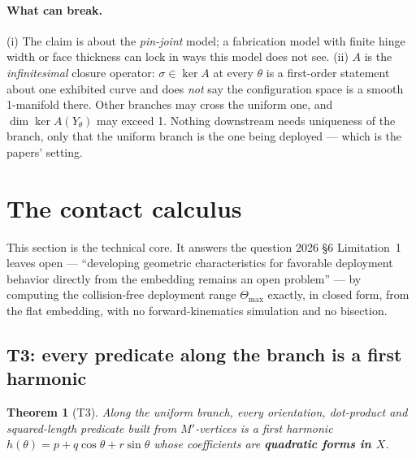 \documentclass[11pt,a4paper]{article}
\newtheorem{theorem}{Theorem}[section]
\theoremstyle{definition}
\newcommand{\Tmax}{\Theta_{\max}}
\newcommand{\Mprime}{M'}
\begin{document}
\paragraph{What can break.} (i) The claim is about the \emph{pin-joint} model; a fabrication
model with finite hinge width or face thickness can lock in ways this model does not see.
(ii) $A$ is the \emph{infinitesimal} closure operator: $\sigma\in\ker A$ at every $\theta$ is
a first-order statement about one exhibited curve and does \emph{not} say the configuration
space is a smooth 1-manifold there. Other branches may cross the uniform one, and
$\dim\ker A(Y_\theta)$ may exceed 1. Nothing downstream needs uniqueness of the branch, only
that the uniform branch is the one being deployed --- which is the papers' setting.

\clearpage
\section{The contact calculus}
\label{sec:contact}

This section is the technical core. It answers the question 2026 §6 Limitation~1 leaves
open --- ``developing geometric characteristics for favorable deployment behavior directly
from the embedding remains an open problem'' --- by computing the collision-free deployment
range $\Tmax$ exactly, in closed form, from the flat embedding, with no forward-kinematics
simulation and no bisection.

\subsection{T3: every predicate along the branch is a first harmonic}

\begin{theorem}[T3]
\label{thm:t3}
Along the uniform branch, every orientation, dot-product and squared-length predicate built
from $\Mprime$-vertices is a \emph{first harmonic}
$h(\theta)=p+q\cos\theta+r\sin\theta$ whose coefficients are \textbf{quadratic forms in $X$}.
\end{theorem}
\end{document}
